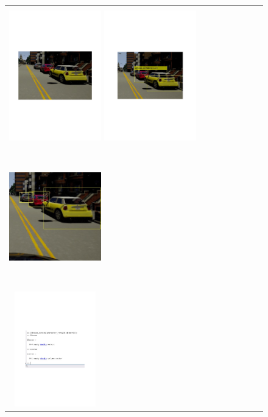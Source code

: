 \begin{figure}
\centering
\begin{tabular}{ lccc } 
\includegraphics[width=4cm, height=6cm]{images/rawImg.pdf}
\includegraphics[width=4cm, height=6cm]{images/RCNN40.pdf} 
\includegraphics[width=4cm, height=6cm]{images/acf.jpg} \\ 
\includegraphics[width=4cm, height=5cm]{images/test4RCNN40.pdf}

\end{tabular}
\end{figure}
